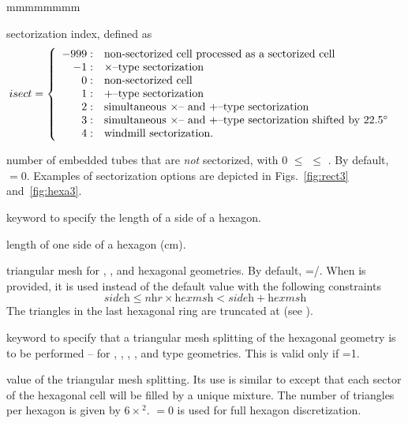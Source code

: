 \begin{ListeDeDescription}{mmmmmmmm}
\item[\dusa{isect}] sectorization index, defined as
\begin{displaymath}
\negthinspace\negthinspace\negthinspace isect = \left\{
\begin{array}{rl}
-999: & \textrm{non-sectorized cell processed as a sectorized cell} \\
-1: & \textrm{$\times$--type sectorization} \\
 0: & \textrm{non-sectorized cell} \\
 1: & \textrm{$+$--type sectorization} \\
 2: & \textrm{simultaneous $\times$-- and $+$--type sectorization} \\
 3: & \textrm{simultaneous $\times$-- and $+$--type sectorization shifted by 22.5$^\circ$} \\
 4: & \textrm{windmill sectorization.} 
\end{array} \right.
\end{displaymath}

\item[\dusa{jsect}] number of embedded tubes that are {\sl not} sectorized, with 0 $\le$  $\le$ . By default,  $=0$. Examples of sectorization options are depicted in Figs.~\ref{fig:rect3} and~\ref{fig:hexa3}.

\item[\moc{SIDE}] keyword to specify the length of a side of a hexagon.

\item[\dusa{sideh}] length of one side of a hexagon (cm).

\item[\dusa{hexmsh}] triangular mesh for , ,  and  hexagonal geometries. By default, =/. When  is provided, it is used instead of the default value with the following constraints 
$$
\textit{sideh} \le \textit{nhr}\times \textit{hexmsh}<\textit{sideh}+\textit{hexmsh}
$$
The triangles in the last hexagonal ring are truncated at  (see ).

\item[\moc{SPLITH}] keyword to specify that a triangular mesh splitting of the hexagonal geometry is to be performed -- for , , , ,  and  type geometries. This is valid only if =1. 

\item[\dusa{isplth}] value of the triangular mesh splitting. Its use is similar to  except that each sector of the hexagonal cell will be filled by a unique mixture. The number of triangles per hexagon is given by $6 \times$$^2$.
 $=0$ is used for full hexagon discretization.


\end{ListeDeDescription}

